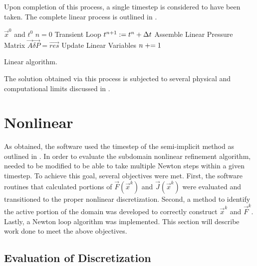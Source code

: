 Upon completion of this process, a single timestep is considered to have been taken.
The complete linear process is outlined in .

\begin{algo}[ht!]
\setlength{\baselineskip}{0.625\baselineskip}
\begin{algorithmic}[1]
\Require $\vec{x}^{0}$ and $t^{0}$
\Set $n = 0$
\Loop \; Transient Loop
    \Set $t^{n+1} : = t^{n} + \dt{}$
	\Algorithm Assemble Linear Pressure Matrix 
   	\Solve $\vec{A} \vec{\delta P} = \vec{res}$
	\Algorithm Update Linear Variables 
	\Set $n \mathrel{+}= 1$
\EndLoop
\end{algorithmic}
\caption{Linear \cobra{} algorithm.}
\label{alg:linCobraAlgorithm}
\end{algo}

The solution obtained via this process is subjected to several physical and computational limits discussed in .

\section{Nonlinear \cobra{}}
\label{sect:nlnCobraSolver}
As obtained, the \cobra{} software used the timestep of the semi-implicit method as outlined in .
In order to evaluate the subdomain nonlinear refinement algorithm, \cobra{} needed to be modified to be able to take multiple Newton steps within a given timestep.
To achieve this goal, several objectives were met.
First, the software routines that calculated portions of $\vec{F}(\vec{x}^{k})$ and $\vec{J}(\vec{x}^{k})$ were evaluated and transitioned to the proper nonlinear discretization.
Second, a method to identify the active portion of the domain was developed to correctly construct $\vec{x}^{k}$ and $\vec{F}^{k}$.
Lastly, a Newton loop algorithm was implemented.
This section will describe work done to meet the above objectives.

\subsection{Evaluation of Discretization}
\label{subsect:nonlinearDiscretization}

